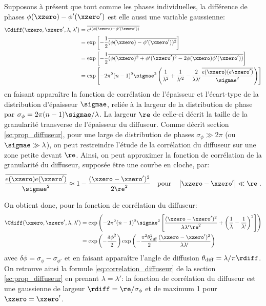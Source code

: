 Supposons à présent que tout comme les phases individuelles, la différence de phases $\phi(\xzero)-\phi'(\xzero')$ est elle aussi une variable gaussienne:
\begin{align}
\Cdiff(\xzero,\xzero',\lambda,\lambda') &= \overline{e^{i(\phi(\xzero) - \phi'(\xzero'))}} \\
&= \exp{\left[-\frac{1}{2} \overline{(\phi(\xzero)-\phi'(\xzero'))^2}\right]} \\
&= \exp{\left[ -\frac{1}{2} \overline{(\phi(\xzero)^2 + \phi'(\xzero')^2 -2 \phi(\xzero) \phi'(\xzero'))} \right] } \\
&= \exp{\left[-2\pi^2 (n-1)^2 \sigmae^2 \left( \frac{1}{\lambda^2} + \frac{1}{\lambda'^2} - \frac{2}{\lambda\lambda'} \frac{\overline{e(\xzero)(e\xzero')}}{\sigmae^2}\right)\right]}
\end{align}
en faisant apparaître la fonction de corrélation de l'épaisseur et l'écart-type de la distribution d'épaisseur $\sigmae$, reliée à la largeur de la distribution de phase par $\sigma_{\phi} = 2\pi (n-1) \sigmae /\lambda$. La largeur $\re$ de celle-ci décrit la taille de la granularité transverse de l'épaisseur du diffuseur. Comme décrit section \ref{sc:prop_diffuseur}, pour une large de distribution de phases $\sigma_{\phi} \gg 2\pi$ (ou $\sigmae \gg \lambda$), on peut restreindre l'étude de la corrélation du diffuseur sur une zone petite devant $\re$. Ainsi, on peut approximer la fonction de corrélation de la granularité du diffuseur, supposée être une courbe en cloche, par:
\begin{equation}
\frac{\overline{e(\xzero)e(\xzero')}}{\sigmae^2}\approx 1- \frac{(\xzero - \xzero')^2}{2\re^2} \quad \text{pour} \quad \left| \xzero-\xzero' \right| \ll \re \text{ .}
\end{equation}

On obtient donc, pour la fonction de corrélation du diffuseur:
\begin{align}
\Cdiff(\xzero,\xzero',\lambda,\lambda') &= \exp{\left( -2 \pi^2 (n-1)^2 \sigmae^2 \left[ \frac{(\xzero - \xzero')^2}{\lambda \lambda' \re^2} + \left( \frac{1}{\lambda} - \frac{1}{\lambda'} \right)^2 \right] \right)} \\
&= \exp{\left(-\frac{{\delta\phi}^2}{2}\right)} \exp{\left(-\frac{\pi^2 \theta_{\mathrm{diff}}^2}{2} \frac{(\xzero-\xzero')^2}{\lambda \lambda'}\right)}
\end{align}
avec $\delta\phi=\sigma_{\phi} - \sigma_{\phi'}$ et en faisant apparaître l'angle de diffusion $\theta_{\mathrm{diff}}=\lambda /\pi \rdiff$. On retrouve ainsi la formule \ref{eq:correlation_diffuseur} de la section \ref{sc:prop_diffuseur} en prenant $\lambda=\lambda'$: la fonction de corrélation du diffuseur est une gaussienne de largeur $\rdiff=\re/\sigma_{\phi}$ et de maximum 1 pour $\xzero=\xzero'$.




